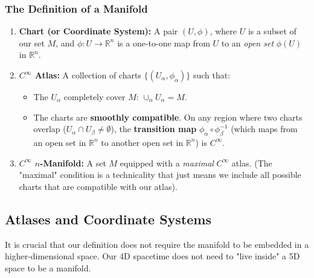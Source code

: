 \documentclass[11pt, a4paper]{report}
\begin{document}
\subsubsection*{The Definition of a Manifold}
\begin{enumerate}
    \item \textbf{Chart (or Coordinate System):} A pair $(U, \phi)$, where $U$ is a subset of our set $M$, and $\phi: U \to \mathbb{R}^n$ is a one-to-one map from $U$ to an \emph{open set} $\phi(U)$ in $\mathbb{R}^n$.
    \item \textbf{$C^\infty$ Atlas:} A collection of charts $\{(U_\alpha, \phi_\alpha)\}$ such that:
        \begin{itemize}
            \item The $U_\alpha$ completely cover $M$: $\cup_\alpha U_\alpha = M$.
            \item The charts are \textbf{smoothly compatible}. On any region where two charts overlap ($U_\alpha \cap U_\beta \neq \emptyset$), the \textbf{transition map} $\phi_\alpha \circ \phi_\beta^{-1}$ (which maps from an open set in $\mathbb{R}^n$ to another open set in $\mathbb{R}^n$) is $C^\infty$.
        \end{itemize}
    
    
    
    
    
    
    
    
    \item \textbf{$C^\infty$ $n$-Manifold:} A set $M$ equipped with a \emph{maximal} $C^\infty$ atlas. (The "maximal" condition is a technicality that just means we include all possible charts that are compatible with our atlas).
\end{enumerate}

\subsection*{Atlases and Coordinate Systems}
It is crucial that our definition does not require the manifold to be embedded in a higher-dimensional space. Our 4D spacetime does not need to "live inside" a 5D space to be a manifold.
\end{document}
